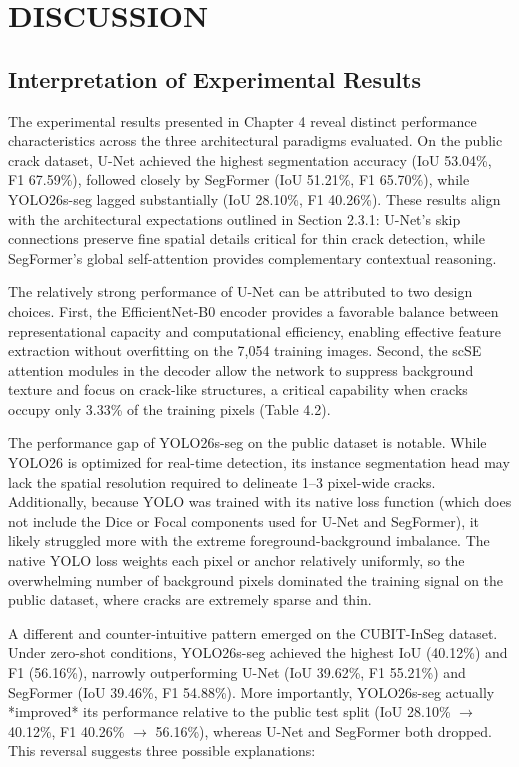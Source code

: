 \chapter{DISCUSSION}
\label{chap:discussion}

\section{Interpretation of Experimental Results}
\label{sec:interpretation_of_experimental_results}
\hs The experimental results presented in Chapter 4 reveal distinct performance characteristics across the three architectural paradigms evaluated. On the public crack dataset, U-Net achieved the highest segmentation accuracy (IoU 53.04\%, F1 67.59\%), followed closely by SegFormer (IoU 51.21\%, F1 65.70\%), while YOLO26s-seg lagged substantially (IoU 28.10\%, F1 40.26\%). These results align with the architectural expectations outlined in Section 2.3.1: U-Net's skip connections preserve fine spatial details critical for thin crack detection, while SegFormer's global self-attention provides complementary contextual reasoning.

\hs The relatively strong performance of U-Net can be attributed to two design choices. First, the EfficientNet-B0 encoder provides a favorable balance between representational capacity and computational efficiency, enabling effective feature extraction without overfitting on the 7,054 training images. Second, the scSE attention modules in the decoder allow the network to suppress background texture and focus on crack-like structures, a critical capability when cracks occupy only 3.33\% of the training pixels (Table 4.2).

\hs The performance gap of YOLO26s-seg on the public dataset is notable. While YOLO26 is optimized for real-time detection, its instance segmentation head may lack the spatial resolution required to delineate 1--3 pixel-wide cracks. Additionally, because YOLO was trained with its native loss function (which does not include the Dice or Focal components used for U-Net and SegFormer), it likely struggled more with the extreme foreground-background imbalance. The native YOLO loss weights each pixel or anchor relatively uniformly, so the overwhelming number of background pixels dominated the training signal on the public dataset, where cracks are extremely sparse and thin.

\hs A different and counter-intuitive pattern emerged on the CUBIT-InSeg dataset. Under zero-shot conditions, YOLO26s-seg achieved the highest IoU (40.12\%) and F1 (56.16\%), narrowly outperforming U-Net (IoU 39.62\%, F1 55.21\%) and SegFormer (IoU 39.46\%, F1 54.88\%). More importantly, YOLO26s-seg actually *improved* its performance relative to the public test split (IoU 28.10\% $\rightarrow$ 40.12\%, F1 40.26\% $\rightarrow$ 56.16\%), whereas U-Net and SegFormer both dropped. This reversal suggests three possible explanations:

